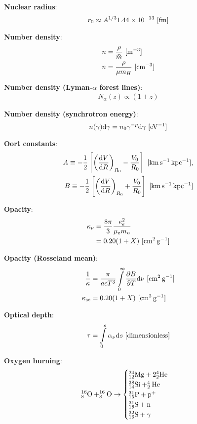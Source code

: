 \documentclass[a4paper,10pt]{article}
\begin{document}
{\noindent}\textbf{Nuclear radius}:
\begin{align*}
    r_0 \approx A^{1/3}1.44\times10^{-13} ~ [{\rm fm}]
\end{align*}

{\noindent}\textbf{Number density}:
\begin{align*}
    n &= \frac{\rho}{\bar{m}} ~ [{\rm m^{-3}}] \\
    n &= \frac{\rho}{\mu m_H} ~ [{\rm cm^{-3}}]
\end{align*}

{\noindent}\textbf{Number density (Lyman-$\alpha$ forest lines)}:
\begin{align*}
    N_\alpha(z) \propto (1+z)
\end{align*}

{\noindent}\textbf{Number density (synchrotron energy)}:
\begin{align*}
    n(\gamma){\rm d}\gamma = n_0\gamma^{-p}{\rm d}\gamma ~ [{\rm eV^{-1}}]
\end{align*}

{\noindent}\textbf{Oort constants}:
\begin{align*}
    A \equiv -\frac{1}{2} \left[\left(\frac{{\rm d}V}{{\rm d}R}\right)_{R_0} -\frac{V_0}{R_0}\right] ~ [{\rm km\,s^{-1}\,kpc^{-1}}],\\
    B \equiv -\frac{1}{2} \left[\left(\frac{{\rm d}V}{{\rm d}R}\right)_{R_0} +\frac{V_0}{R_0}\right] ~ [{\rm km\,s^{-1}\,kpc^{-1}}]
\end{align*}

{\noindent}\textbf{Opacity}:
\begin{align*}
    \kappa_\nu &= \frac{8\pi}{3} \frac{e_e^2}{\mu_em_u} \\
    &= 0.20(1+X) ~ [{\rm cm^2\,g^{-1}}]
\end{align*}

{\noindent}\textbf{Opacity (Rosseland mean)}:
\begin{align*} 
    \frac{1}{\kappa} &= \frac{\pi}{acT^3} \int\limits_0^\infty \frac{\partial B}{\partial T} {\rm d}\nu  ~ [{\rm cm^2\,g^{-1}}] \\
    \kappa_{\rm sc} &= 0.20(1+X) ~ [{\rm cm^2\,g^{-1}}]
\end{align*}

{\noindent}\textbf{Optical depth}:
\begin{align*}
    \tau = \int\limits_0^s \alpha_\nu\mathrm{d}s ~ [{\rm dimensionless}]
\end{align*}

{\noindent}\textbf{Oxygen burning}:
\begin{equation*}
^{16}_8{\rm O} + ^{16}_8{\rm O} \rightarrow 
\begin{cases}
    {\rm ^{24}_{12}Mg + 2^4_2He} \\
    {\rm ^{28}_{14}Si + ^4_2He} \\
    {\rm ^{31}_{15}P + p^+} \\
    {\rm ^{31}_{16}S + n} \\
    {\rm ^{32}_{16}S + \gamma}
\end{cases}
\end{equation*}
\end{document}

